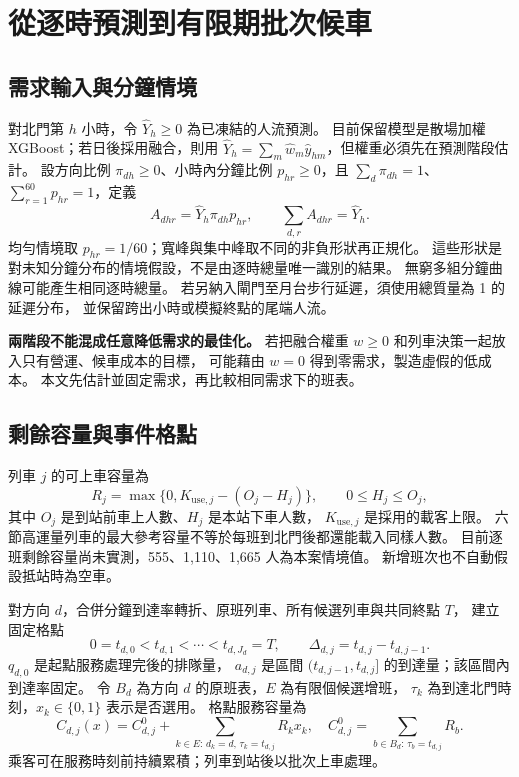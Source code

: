\section{從逐時預測到有限期批次候車}

\subsection{需求輸入與分鐘情境}
對北門第 $h$ 小時，令 $\widehat Y_h\ge0$ 為已凍結的人流預測。
目前保留模型是散場加權 XGBoost；若日後採用融合，則用
$\widehat Y_h=\sum_m\widehat w_m\widehat y_{hm}$，但權重必須先在預測階段估計。
設方向比例 $\pi_{dh}\ge0$、小時內分鐘比例 $p_{hr}\ge0$，且
$\sum_d\pi_{dh}=1$、$\sum_{r=1}^{60}p_{hr}=1$，定義
\begin{equation}
A_{dhr}=\widehat Y_h\pi_{dh}p_{hr},\qquad
\sum_{d,r}A_{dhr}=\widehat Y_h.
\label{eq:arrival}
\end{equation}
均勻情境取 $p_{hr}=1/60$；寬峰與集中峰取不同的非負形狀再正規化。
這些形狀是對未知分鐘分布的情境假設，不是由逐時總量唯一識別的結果。
無窮多組分鐘曲線可能產生相同逐時總量。
若另納入閘門至月台步行延遲，須使用總質量為 1 的延遲分布，
並保留跨出小時或模擬終點的尾端人流。

\textbf{兩階段不能混成任意降低需求的最佳化。}
若把融合權重 $w\ge0$ 和列車決策一起放入只有營運、候車成本的目標，
可能藉由 $w=0$ 得到零需求，製造虛假的低成本。
本文先估計並固定需求，再比較相同需求下的班表。

\subsection{剩餘容量與事件格點}
列車 $j$ 的可上車容量為
\begin{equation}
R_j=\max\{0,K_{\mathrm{use},j}-(O_j-H_j)\},\qquad 0\le H_j\le O_j,
\end{equation}
其中 $O_j$ 是到站前車上人數、$H_j$ 是本站下車人數，
$K_{\mathrm{use},j}$ 是採用的載客上限。
六節高運量列車的最大參考容量不等於每班到北門後都還能載入同樣人數。
目前逐班剩餘容量尚未實測，555、1,110、1,665 人為本案情境值。
新增班次也不自動假設抵站時為空車。

對方向 $d$，合併分鐘到達率轉折、原班列車、所有候選列車與共同終點 $T$，
建立固定格點
\[
0=t_{d,0}<t_{d,1}<\cdots<t_{d,J_d}=T,\qquad
\Delta_{d,j}=t_{d,j}-t_{d,j-1}.
\]
$q_{d,0}$ 是起點服務處理完後的排隊量，
$a_{d,j}$ 是區間 $(t_{d,j-1},t_{d,j}]$ 的到達量；該區間內到達率固定。
令 $B_d$ 為方向 $d$ 的原班表，$E$ 為有限個候選增班，
$\tau_k$ 為到達北門時刻，$x_k\in\{0,1\}$ 表示是否選用。
格點服務容量為
\begin{equation}
C_{d,j}(x)=C^0_{d,j}
+\sum_{k\in E:\,d_k=d,\,\tau_k=t_{d,j}}R_kx_k,
\quad
C^0_{d,j}=\sum_{b\in B_d:\,\tau_b=t_{d,j}}R_b.
\label{eq:capacity}
\end{equation}
乘客可在服務時刻前持續累積；列車到站後以批次上車處理。


